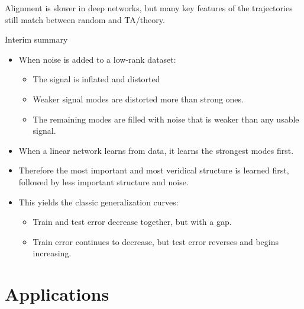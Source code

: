 \documentclass{beamer}
\begin{document}

\begin{frame}[standout]
Alignment is slower in deep networks, but many key features of the trajectories still match between random and TA/theory.
\end{frame}


\begin{frame}{Interim summary}
\begin{itemize}[<+->]
\item When noise is added to a low-rank dataset: 
    \begin{itemize}
    \item The signal is inflated and distorted
    \item Weaker signal modes are distorted more than strong ones.
    \item The remaining modes are filled with noise that is weaker than any usable signal.  
    \end{itemize}
\item When a linear network learns from data, it learns the strongest modes first.
\item Therefore the most important and most veridical structure is learned first, followed by less important structure and noise.
\item This yields the classic generalization curves:
    \begin{itemize}
    \item Train and test error decrease together, but with a gap. 
    \item Train error continues to decrease, but test error reverses and begins increasing. 
    \end{itemize}
\end{itemize}
\end{frame}

\section{Applications}
\end{document}
